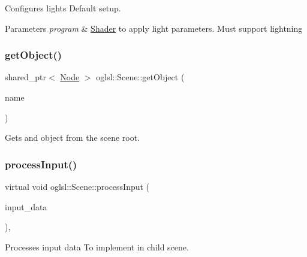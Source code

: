 Configures lights Default setup. 


\begin{DoxyParams}{Parameters}
{\em program} & \mbox{\hyperlink{classoglsl_1_1_shader}{Shader}} to apply light parameters. Must support lightning \\
\hline
\end{DoxyParams}
\mbox{\label{classoglsl_1_1_scene_a10b398b3e59b41c5fb0dbadb8120e0f3}} 
\subsubsection{\texorpdfstring{get\+Object()}{getObject()}}
{\footnotesize\ttfamily shared\+\_\+ptr$<$ \mbox{\hyperlink{classoglsl_1_1_node}{Node}} $>$ oglsl\+::\+Scene\+::get\+Object (\begin{DoxyParamCaption}\item[{string}]{name }\end{DoxyParamCaption})\hspace{0.3cm}{\ttfamily [inline]}}



Gets and object from the scene root. 

\mbox{\label{classoglsl_1_1_scene_a7884a3f2b7900aaf348a62ad23223c8e}} 
\subsubsection{\texorpdfstring{process\+Input()}{processInput()}}
{\footnotesize\ttfamily virtual void oglsl\+::\+Scene\+::process\+Input (\begin{DoxyParamCaption}\item[{\mbox{\hyperlink{classoglsl_1_1_input_a3b21d7328538e661f366af5d6059c197}{Input\+::\+Input\+Data}}}]{input\+\_\+data }\end{DoxyParamCaption})\hspace{0.3cm}{\ttfamily [inline]}, {\ttfamily [virtual]}}



Processes input data To implement in child scene. 



